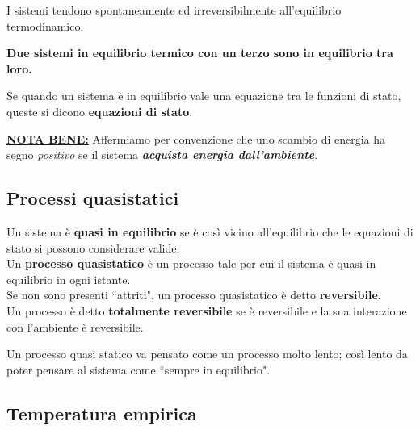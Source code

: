 \begin{remark}
I sistemi tendono spontaneamente ed irreversibilmente all'equilibrio termodinamico.
\end{remark}

\begin{fact}
\textbf{Due sistemi in equilibrio termico con un terzo sono in equilibrio tra loro.}
\end{fact}

\begin{definition}
Se quando un sistema \`e in equilibrio vale una equazione tra le funzioni di stato, queste si dicono \textbf{equazioni di stato}.
\end{definition}

\begin{remark}
\underline{\textbf{NOTA BENE:}} Affermiamo per convenzione che uno scambio di energia ha segno \textit{positivo} se il sistema \textbf{\textit{acquista energia dall'ambiente}}.
\end{remark}



\subsection{Processi quasistatici}

\begin{definition}
Un sistema \`e \textbf{quasi in equilibrio} se \`e cos\`i vicino all'equilibrio che le equazioni di stato si possono considerare valide.\\ 
Un \textbf{processo quasistatico} \`e un processo tale per cui il sistema \`e quasi in equilibrio in ogni istante.\\
Se non sono presenti ``attriti", un processo quasistatico \`e detto \textbf{reversibile}.\\
Un processo \`e detto \textbf{totalmente reversibile} se \`e reversibile e la sua interazione con l'ambiente \`e reversibile.
\end{definition}

\begin{remark}
Un processo quasi statico va pensato come un processo molto lento; cos\`i lento da poter pensare al sistema come ``sempre in equilibrio".
\end{remark}



\subsection{Temperatura empirica}

